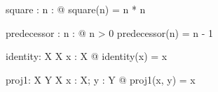 \documentclass[a4paper,10pt,fleqn]{article}
\begin{document}
\begin{axdef}
square : \nat \fun \nat
\where
\forall n : \nat @ square(n) = n * n
\end{axdef}

\begin{axdef}
predecessor : \nat \pfun \nat
\where
\forall n : \nat @ n > 0 \implies predecessor(n) = n - 1
\end{axdef}

\begin{gendef}[X]
  identity: X \fun X
\where
  \forall x : X @ identity(x) = x
\end{gendef}

\begin{gendef}[X, Y]
  proj1: X \cross Y \fun X
\where
  \forall x : X; y : Y @ proj1(x, y) = x
\end{gendef}
\end{document}
